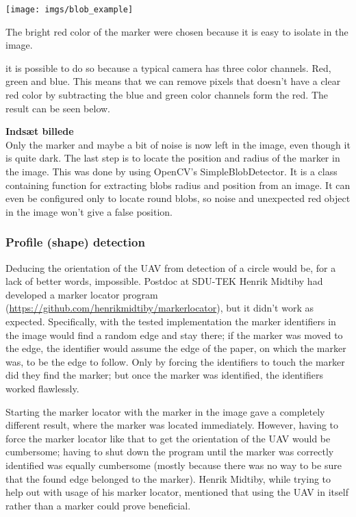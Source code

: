 \begin{center}
	\texttt{[image: imgs/blob\_example]}
\end{center}
The bright red color of the marker were chosen because it is easy to isolate in the image. 

it is possible to do so because a typical camera has three color channels. Red, green and blue. This means that we can remove pixels that doesn't have a clear red color by subtracting the blue and green color channels form the red. 
The result can be seen below.

\Huge
\textbf{Indsæt billede}
\normalsize\\
Only the marker and maybe a bit of noise is now left in the image, even though it is quite dark.
The last step is to locate the position and radius of the marker in the image. This was done by using OpenCV’s SimpleBlobDetector. It is a class containing function for extracting blobs radius and position from an image. It can even be configured only to locate round blobs, so noise and unexpected red object in the image won't give a false position.

\subsubsection{Profile (shape) detection}
Deducing the orientation of the UAV from detection of a circle would be, for a lack of better words, impossible. Postdoc at SDU-TEK Henrik Midtiby had developed a marker locator program (\url{https://github.com/henrikmidtiby/markerlocator}), but it didn’t work as expected. Specifically, with the tested implementation the marker identifiers in the image would find a random edge and stay there; if the marker was moved to the edge, the identifier would assume the edge of the paper, on which the marker was, to be the edge to follow. Only by forcing the identifiers to touch the marker did they find the marker; but once the marker was identified, the identifiers worked flawlessly. 

Starting the marker locator with the marker in the image gave a completely different result, where the marker was located immediately. However, having to force the marker locator like that to get the orientation of the UAV would be cumbersome; having to shut down the program until the marker was correctly identified was equally cumbersome (mostly because there was no way to be sure that the found edge belonged to the marker). Henrik Midtiby, while trying to help out with usage of his marker locator, mentioned that using the UAV in itself rather than a marker could prove beneficial.

